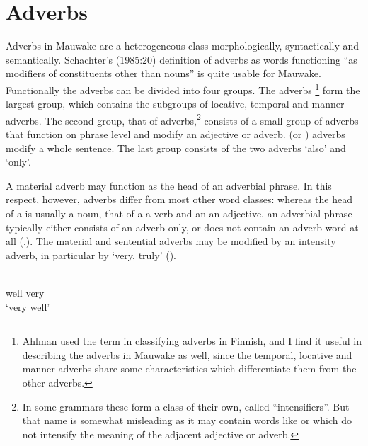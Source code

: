 \section{Adverbs}
{}
Adverbs in Mauwake are a heterogeneous class morphologically, syntactically and semantically. Schachter's (1985:20) definition of adverbs as words functioning ``{as modifiers of constituents other than nouns}'' is quite usable for Mauwake. Functionally the adverbs can be divided into four groups. The  adverbs \citep{Ahlman1933}\footnote{Ahlman used the term in classifying adverbs in Finnish, and I find it useful in describing the adverbs in Mauwake as well, since the temporal, locative and manner adverbs share some characteristics which differentiate them from the other adverbs.} form the largest group, which contains the subgroups of locative, temporal and manner adverbs. The second group, that of  adverbs,\footnote{In some grammars these form a class of their own, called ``intensifiers''. But that name is somewhat misleading as it may contain words like  or  which do not intensify the meaning of the adjacent adjective or adverb.} consists of a small group of adverbs that function on phrase level and modify an adjective or adverb.  (or ) adverbs modify a whole sentence. The last group consists of the two  adverbs  `also' and  `only'.

A material adverb may function as the head of an adverbial phrase. In this respect, however, adverbs differ from most other word classes: whereas the head of a  is usually a noun, that of a  a verb and an  an adjective, an adverbial phrase typically either consists of an adverb only, or does not contain an adverb word at all (.). The material and sentential adverbs may be modified by an intensity adverb, in particular by  `very, truly' ().

\ea%
\label{ex:x462}
\gll {}  \\
well very\\
\glt`very well'
\z

